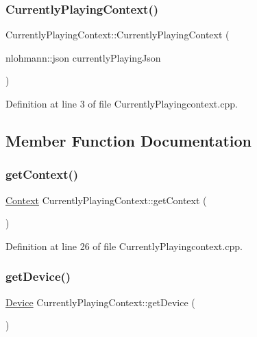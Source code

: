 \subsubsection{\texorpdfstring{Currently\+Playing\+Context()}{CurrentlyPlayingContext()}}
{\footnotesize\ttfamily Currently\+Playing\+Context\+::\+Currently\+Playing\+Context (\begin{DoxyParamCaption}\item[{nlohmann\+::json}]{currently\+Playing\+Json }\end{DoxyParamCaption})}



Definition at line 3 of file Currently\+Playingcontext.\+cpp.



\subsection{Member Function Documentation}
\mbox{\label{class_currently_playing_context_afa603459ef011d1bf2e487216fe0bf71}} 
\subsubsection{\texorpdfstring{get\+Context()}{getContext()}}
{\footnotesize\ttfamily \mbox{\hyperlink{class_context}{Context}} Currently\+Playing\+Context\+::get\+Context (\begin{DoxyParamCaption}{ }\end{DoxyParamCaption})}



Definition at line 26 of file Currently\+Playingcontext.\+cpp.

\mbox{\label{class_currently_playing_context_a7e0b558d2fb6fc1932e143e680de76d1}} 
\subsubsection{\texorpdfstring{get\+Device()}{getDevice()}}
{\footnotesize\ttfamily \mbox{\hyperlink{class_device}{Device}} Currently\+Playing\+Context\+::get\+Device (\begin{DoxyParamCaption}{ }\end{DoxyParamCaption})}



